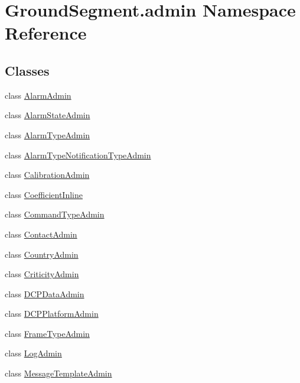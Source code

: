 \hypertarget{namespace_ground_segment_1_1admin}{}\section{Ground\+Segment.\+admin Namespace Reference}
\label{namespace_ground_segment_1_1admin}
\subsection*{Classes}
\begin{DoxyCompactItemize}
\item 
class \hyperlink{class_ground_segment_1_1admin_1_1_alarm_admin}{Alarm\+Admin}
\item 
class \hyperlink{class_ground_segment_1_1admin_1_1_alarm_state_admin}{Alarm\+State\+Admin}
\item 
class \hyperlink{class_ground_segment_1_1admin_1_1_alarm_type_admin}{Alarm\+Type\+Admin}
\item 
class \hyperlink{class_ground_segment_1_1admin_1_1_alarm_type_notification_type_admin}{Alarm\+Type\+Notification\+Type\+Admin}
\item 
class \hyperlink{class_ground_segment_1_1admin_1_1_calibration_admin}{Calibration\+Admin}
\item 
class \hyperlink{class_ground_segment_1_1admin_1_1_coefficient_inline}{Coefficient\+Inline}
\item 
class \hyperlink{class_ground_segment_1_1admin_1_1_command_type_admin}{Command\+Type\+Admin}
\item 
class \hyperlink{class_ground_segment_1_1admin_1_1_contact_admin}{Contact\+Admin}
\item 
class \hyperlink{class_ground_segment_1_1admin_1_1_country_admin}{Country\+Admin}
\item 
class \hyperlink{class_ground_segment_1_1admin_1_1_criticity_admin}{Criticity\+Admin}
\item 
class \hyperlink{class_ground_segment_1_1admin_1_1_d_c_p_data_admin}{D\+C\+P\+Data\+Admin}
\item 
class \hyperlink{class_ground_segment_1_1admin_1_1_d_c_p_platform_admin}{D\+C\+P\+Platform\+Admin}
\item 
class \hyperlink{class_ground_segment_1_1admin_1_1_frame_type_admin}{Frame\+Type\+Admin}
\item 
class \hyperlink{class_ground_segment_1_1admin_1_1_log_admin}{Log\+Admin}
\item 
class \hyperlink{class_ground_segment_1_1admin_1_1_message_template_admin}{Message\+Template\+Admin}

\end{DoxyCompactItemize}
